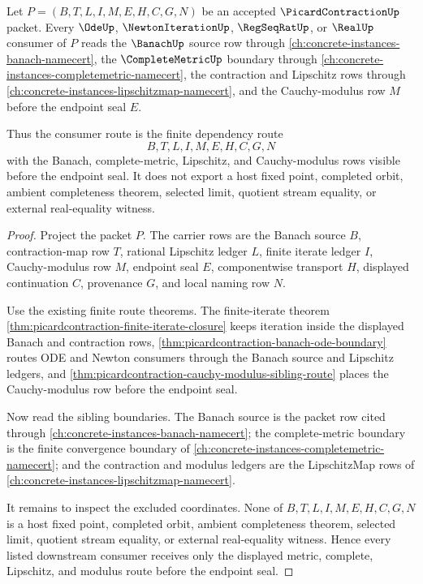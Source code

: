 \begin{theorem}
\label{thm:picardcontraction-metric-complete-lipschitz-consumer-route}
Let $P=(B,T,L,I,M,E,H,C,G,N)$ be an accepted $\PicardContractionUp$ packet. Every $\OdeUp$, $\NewtonIterationUp$, $\RegSeqRatUp$, or $\RealUp$ consumer of $P$ reads the $\BanachUp$ source row through \autoref{ch:concrete-instances-banach-namecert}, the $\CompleteMetricUp$ boundary through \autoref{ch:concrete-instances-completemetric-namecert}, the contraction and Lipschitz rows through \autoref{ch:concrete-instances-lipschitzmap-namecert}, and the Cauchy-modulus row $M$ before the endpoint seal $E$.

Thus the consumer route is the finite dependency route
$$
B,T,L,I,M,E,H,C,G,N
$$
with the Banach, complete-metric, Lipschitz, and Cauchy-modulus rows visible before the endpoint seal. It does not export a host fixed point, completed orbit, ambient completeness theorem, selected limit, quotient stream equality, or external real-equality witness.
\end{theorem}
\begin{proof}
Project the packet $P$. The carrier rows are the Banach source $B$, contraction-map row $T$, rational Lipschitz ledger $L$, finite iterate ledger $I$, Cauchy-modulus row $M$, endpoint seal $E$, componentwise transport $H$, displayed continuation $C$, provenance $G$, and local naming row $N$.

Use the existing finite route theorems. The finite-iterate theorem \autoref{thm:picardcontraction-finite-iterate-closure} keeps iteration inside the displayed Banach and contraction rows, \autoref{thm:picardcontraction-banach-ode-boundary} routes ODE and Newton consumers through the Banach source and Lipschitz ledgers, and \autoref{thm:picardcontraction-cauchy-modulus-sibling-route} places the Cauchy-modulus row before the endpoint seal.

Now read the sibling boundaries. The Banach source is the packet row cited through \autoref{ch:concrete-instances-banach-namecert}; the complete-metric boundary is the finite convergence boundary of \autoref{ch:concrete-instances-completemetric-namecert}; and the contraction and modulus ledgers are the LipschitzMap rows of \autoref{ch:concrete-instances-lipschitzmap-namecert}.

It remains to inspect the excluded coordinates. None of $B,T,L,I,M,E,H,C,G,N$ is a host fixed point, completed orbit, ambient completeness theorem, selected limit, quotient stream equality, or external real-equality witness. Hence every listed downstream consumer receives only the displayed metric, complete, Lipschitz, and modulus route before the endpoint seal.
\end{proof}
